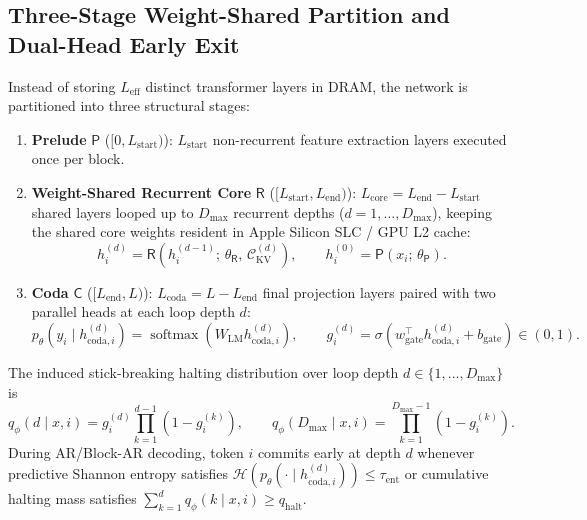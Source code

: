 \documentclass[10pt,a4paper]{article}
\begin{document}
\subsection{Three-Stage Weight-Shared Partition and Dual-Head Early Exit}
Instead of storing $L_{\mathrm{eff}}$ distinct transformer layers in DRAM, the network is partitioned into three structural stages:
\begin{enumerate}[leftmargin=18pt, itemsep=2pt]
  \item \textbf{Prelude} $\mathsf{P}$ ($[0, L_{\mathrm{start}})$): $L_{\mathrm{start}}$ non-recurrent feature extraction layers executed once per block.
  \item \textbf{Weight-Shared Recurrent Core} $\mathsf{R}$ ($[L_{\mathrm{start}}, L_{\mathrm{end}})$): $L_{\mathrm{core}} = L_{\mathrm{end}} - L_{\mathrm{start}}$ shared layers looped up to $D_{\max}$ recurrent depths ($d = 1, \dots, D_{\max}$), keeping the shared core weights resident in Apple Silicon SLC / GPU L2 cache:
  \begin{equation}
    h_i^{(d)} = \mathsf{R}\!\left(h_i^{(d-1)};\, \theta_{\mathsf{R}},\, \mathcal{C}_{\mathrm{KV}}^{(d)}\right), \qquad h_i^{(0)} = \mathsf{P}(x_i;\, \theta_{\mathsf{P}}).
  \end{equation}
  \item \textbf{Coda} $\mathsf{C}$ ($[L_{\mathrm{end}}, L)$): $L_{\mathrm{coda}} = L - L_{\mathrm{end}}$ final projection layers paired with two parallel heads at each loop depth $d$:
  \begin{equation}
    p_\theta(y_i \mid h_{\mathrm{coda},i}^{(d)}) = \operatorname{softmax}(W_{\mathrm{LM}} h_{\mathrm{coda},i}^{(d)}), \qquad g_i^{(d)} = \sigma(w_{\mathrm{gate}}^\top h_{\mathrm{coda},i}^{(d)} + b_{\mathrm{gate}}) \in (0,1).
  \end{equation}
\end{enumerate}
The induced stick-breaking halting distribution over loop depth $d \in \{1, \dots, D_{\max}\}$ is
\begin{equation}
  q_\phi(d \mid x, i) = g_i^{(d)} \prod_{k=1}^{d-1} \left(1 - g_i^{(k)}\right), \qquad q_\phi(D_{\max} \mid x, i) = \prod_{k=1}^{D_{\max}-1} \left(1 - g_i^{(k)}\right).
\end{equation}
During AR/Block-AR decoding, token $i$ commits early at depth $d$ whenever predictive Shannon entropy satisfies $\mathcal{H}(p_\theta(\cdot \mid h_{\mathrm{coda},i}^{(d)})) \le \tau_{\mathrm{ent}}$ or cumulative halting mass satisfies $\sum_{k=1}^d q_\phi(k \mid x, i) \ge q_{\mathrm{halt}}$.
\end{document}
